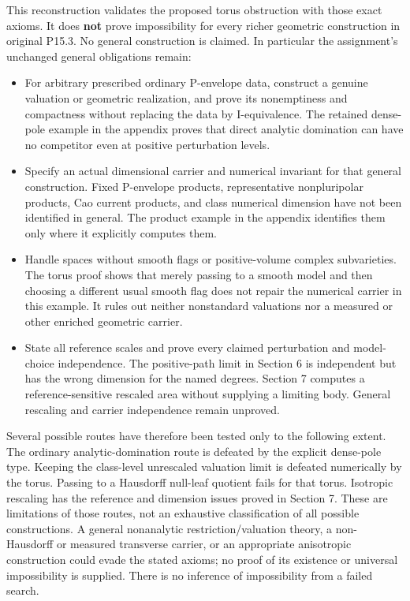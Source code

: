 \documentclass[11pt]{article}
\begin{document}
This reconstruction validates the proposed torus obstruction with those exact axioms. It does \textbf{not} prove impossibility for every richer geometric construction in original P15.3. No general construction is claimed. In particular the assignment's unchanged general obligations remain:

\begin{itemize}
\item For arbitrary prescribed ordinary P-\allowbreak{}envelope data, construct a genuine valuation or geometric realization, and prove its nonemptiness and compactness without replacing the data by I-\allowbreak{}equivalence. The retained dense-\allowbreak{}pole example in the appendix proves that direct analytic domination can have no competitor even at positive perturbation levels.
\item Specify an actual dimensional carrier and numerical invariant for that general construction. Fixed P-\allowbreak{}envelope products, representative nonpluripolar products, Cao current products, and class numerical dimension have not been identified in general. The product example in the appendix identifies them only where it explicitly computes them.
\item Handle spaces without smooth flags or positive-\allowbreak{}volume complex subvarieties. The torus proof shows that merely passing to a smooth model and then choosing a different usual smooth flag does not repair the numerical carrier in this example. It rules out neither nonstandard valuations nor a measured or other enriched geometric carrier.
\item State all reference scales and prove every claimed perturbation and model-\allowbreak{}choice independence. The positive-\allowbreak{}path limit in Section 6 is independent but has the wrong dimension for the named degrees. Section 7 computes a reference-\allowbreak{}sensitive rescaled area without supplying a limiting body. General rescaling and carrier independence remain unproved.

\end{itemize}
Several possible routes have therefore been tested only to the following extent. The ordinary analytic-\allowbreak{}domination route is defeated by the explicit dense-\allowbreak{}pole type. Keeping the class-\allowbreak{}level unrescaled valuation limit is defeated numerically by the torus. Passing to a Hausdorff null-\allowbreak{}leaf quotient fails for that torus. Isotropic rescaling has the reference and dimension issues proved in Section 7. These are limitations of those routes, not an exhaustive classification of all possible constructions. A general nonanalytic restriction/\allowbreak{}valuation theory, a non-\allowbreak{}Hausdorff or measured transverse carrier, or an appropriate anisotropic construction could evade the stated axioms; no proof of its existence or universal impossibility is supplied. There is no inference of impossibility from a failed search.
\end{document}
